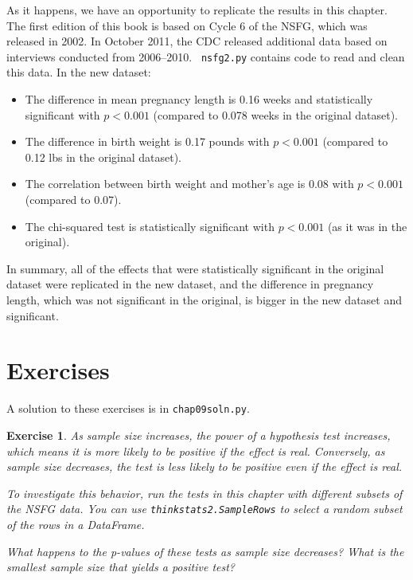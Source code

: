 \documentclass[12pt]{book}
\theoremstyle{exercise}
\newtheorem{exercise}{Exercise}[chapter]
\begin{document}
As it happens, we have an opportunity to replicate the results in this
chapter.  The first edition of this book is based on Cycle 6 of the
NSFG, which was released in 2002.  In October 2011, the CDC released
additional data based on interviews conducted from 2006--2010.  {\tt
  nsfg2.py} contains code to read and clean this data.  In the new
dataset:%

\begin{itemize}

\item The difference in mean pregnancy length is
0.16 weeks and statistically significant with $p < 0.001$ (compared
to 0.078 weeks in the original dataset).%
%
%

\item The difference in birth weight is 0.17 pounds with $p < 0.001$
(compared to 0.12 lbs in the original dataset).%
%

\item The correlation between birth weight and mother's age is
0.08 with $p < 0.001$ (compared to 0.07).

\item The chi-squared test is statistically significant with
$p < 0.001$ (as it was in the original).

\end{itemize}

In summary, all of the effects that were statistically significant
in the original dataset were replicated in the new dataset, and the
difference in pregnancy length, which was not significant in the
original, is bigger in the new dataset and significant.


\section{Exercises}

A solution to these exercises is in \verb"chap09soln.py".

\begin{exercise}
As sample size increases, the power of a hypothesis test increases,
which means it is more likely to be positive if the effect is real.
Conversely, as sample size decreases, the test is less likely to
be positive even if the effect is real.%

To investigate this behavior, run the tests in this chapter with
different subsets of the NSFG data.  You can use {\tt thinkstats2.SampleRows}
to select a random subset of the rows in a DataFrame.%
%
%

What happens to the p-values of these tests as sample size decreases?
What is the smallest sample size that yields a positive test?%
\end{exercise}
\end{document}
